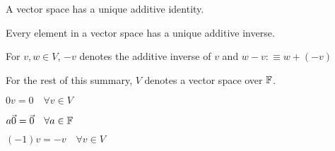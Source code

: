 \setcounter{thm}{25}
\begin{thm}
  A vector space has a unique additive identity.
\end{thm}

\begin{thm}
  Every element in a vector space has a unique additive inverse.
\end{thm}

\begin{mydef}
  For $v,w\in V$, $-v$ denotes the additive inverse of $v$ and $w-v:\equiv w+(-v)$
\end{mydef}

\begin{mydef}
  For the rest of this summary, $V$ denotes a vector space over $\mathbb{F}$.
\end{mydef}

\begin{thm}
  $0v = 0 \quad \forall v\in V$
\end{thm}

\begin{thm}
  $a \vec0= \vec0 \quad \forall a\in \mathbb{F}$
\end{thm}

\begin{thm}
  $(-1)v = -v \quad \forall v\in V$
\end{thm}
